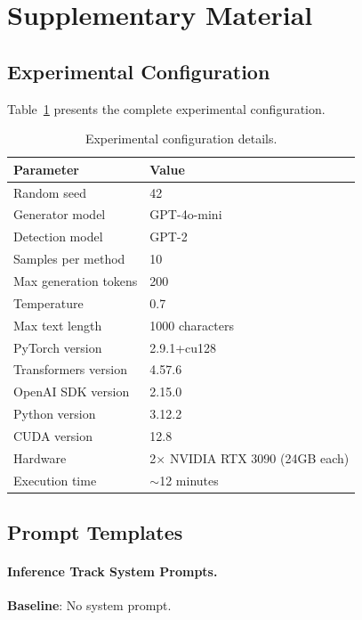 \section{Supplementary Material}
\label{sec:appendix}

\subsection{Experimental Configuration}

Table~\ref{tab:config} presents the complete experimental configuration.

\begin{table}[h]
\centering
\caption{Experimental configuration details.}
\label{tab:config}
\small
\begin{tabular}{@{}ll@{}}
\toprule
\textbf{Parameter} & \textbf{Value} \\
\midrule
Random seed & 42 \\
Generator model & GPT-4o-mini \\
Detection model & GPT-2 \\
Samples per method & 10 \\
Max generation tokens & 200 \\
Temperature & 0.7 \\
Max text length & 1000 characters \\
\midrule
PyTorch version & 2.9.1+cu128 \\
Transformers version & 4.57.6 \\
OpenAI SDK version & 2.15.0 \\
Python version & 3.12.2 \\
CUDA version & 12.8 \\
\midrule
Hardware & 2$\times$ NVIDIA RTX 3090 (24GB each) \\
Execution time & $\sim$12 minutes \\
\bottomrule
\end{tabular}
\end{table}

\subsection{Prompt Templates}

\paragraph{Inference Track System Prompts.}

\textbf{Baseline}: No system prompt.

